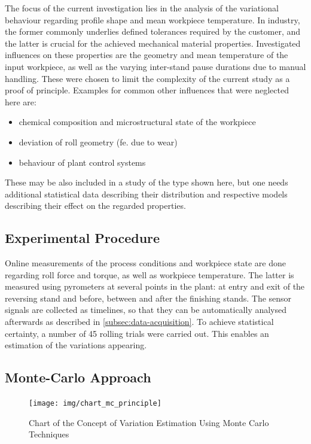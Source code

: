 The focus of the current investigation lies in the analysis of the variational behaviour regarding profile shape and mean workpiece temperature.
In industry, the former commonly underlies defined tolerances required by the customer, and the latter is crucial for the achieved mechanical material properties.
Investigated influences on these properties are the geometry and mean temperature of the input workpiece, as well as the varying inter-stand pause durations due to manual handling.
These were chosen to limit the complexity of the current study as a proof of principle.
Examples for common other influences that were neglected here are:
\begin{itemize}
    \item chemical composition and microstructural state of the workpiece
    \item deviation of roll geometry (fe. due to wear)
    \item behaviour of plant control systems
\end{itemize}
These may be also included in a study of the type shown here, but one needs additional statistical data describing their distribution and respective models describing their effect on the regarded properties.

\subsection{Experimental Procedure}\label{subsec:experimental-procedure}

Online measurements of the process conditions and workpiece state are done regarding roll force and torque, as well as workpiece temperature.
The latter is measured using pyrometers at several points in the plant: at entry and exit of the reversing stand and before, between and after the finishing stands.
The sensor signals are collected as timelines, so that they can be automatically analysed afterwards as described in \autoref{subsec:data-acquisition}.
To achieve statistical certainty, a number of 45 rolling trials were carried out.
This enables an estimation of the variations appearing.

\subsection{Monte-Carlo Approach}\label{subsec:monte-carlo-approach}

\begin{figure}
    \centering
    \texttt{[image: img/chart\_mc\_principle]}
    \caption{Chart of the Concept of Variation Estimation Using Monte Carlo Techniques}
    \label{fig:chart_mc_principle}
\end{figure}

